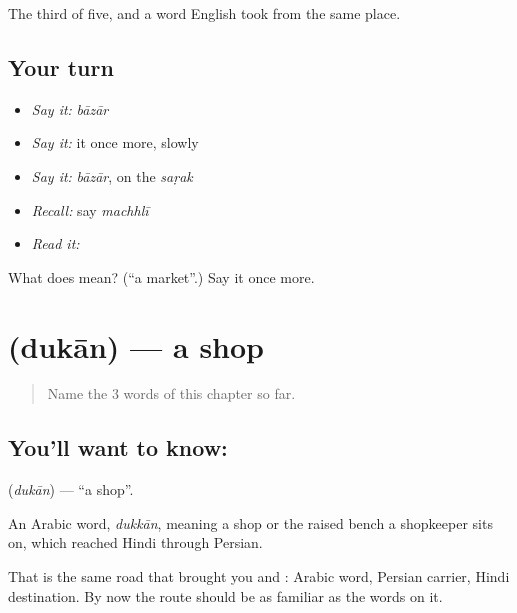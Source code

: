 \begin{grammarlens}[title={What you've built}]
The third of five, and a word English took from the same place.
\end{grammarlens}

\subsection*{Your turn}
\begin{itemize}
\raggedright
  \item \emph{Say it:} \emph{bāzār}
  \item \emph{Say it:} it once more, slowly
  \item \emph{Say it:} \emph{bāzār}, on the \emph{saṛak}
  \item \emph{Recall:} say \emph{machhlī}
  \item \emph{Read it:} \textbf{}
\end{itemize}

\begin{tcolorbox}[breakable,colback=teal!4,colframe=teal!35!black,title={Before you move on}]
What does  mean? (\textquotedblleft{}a market\textquotedblright{}.) Say it once more.
\end{tcolorbox}
\section[\texorpdfstring{\hi{दुकान} (dukān)}{दुकान (dukān)}]{ (dukān) — a shop}

\label{lesson:HI-C56-shop}



\begin{quote}
Name the 3 words of this chapter so far.
\end{quote}

\subsection*{You'll want to know: }
\textbf{} (\emph{dukān}) — \textquotedblleft{}a shop\textquotedblright{}.

An Arabic word, \emph{dukkān}, meaning a shop or the raised bench a shopkeeper sits on, which reached Hindi through Persian.

That is the same road that brought you  and : Arabic word, Persian carrier, Hindi destination. By now the route should be as familiar as the words on it.

